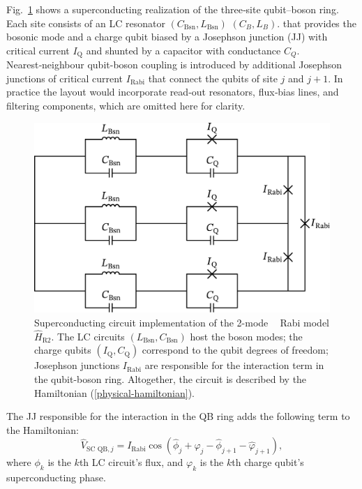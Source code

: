 \documentclass[reprint, aps, prx, amsmath, amssymb, longbibliography, superscriptaddress]{revtex4-2}
\newcommand{\dl}[1]{{\color{red}#1}}
\DeclareMathOperator{\Zthree}{\mathbb{Z}_3}
\begin{document}
Fig.~\ref{fig:superconducting-Rabi} shows a superconducting realization of the three‑site qubit–boson ring. Each site consists of an LC resonator $(C_{\text{Bsn}}, L_{\text{Bsn}})$ 
\dl{$(C_B, L_B)$}.
that provides the bosonic mode and a charge qubit biased by a Josephson junction (JJ) with critical current $I_{\text{Q}}$ and shunted by a capacitor with conductance $C_{Q}$. Nearest‑neighbour qubit-boson coupling is introduced by additional Josephson junctions of critical current $I_{\text{Rabi}}$ \cite{siewert_aspects_2000,rasmussen_controllable_2019,shafranjuk_twoqubit_2006,allman_tunable_2014,hu_controllable_2007} that connect the qubits of site $j$ and $j+1$. In practice the layout would incorporate read‑out resonators, flux‑bias lines, and filtering components, which are omitted here for clarity. 

\begin{figure}[t]
  \includegraphics[width=\linewidth]{pics/SC_Rabi_circuit_svg-tex.pdf}
  \caption{Superconducting circuit implementation of the 2-mode $\Zthree$ Rabi model $\hat H_{\text{R}2}$. The LC circuits $(L_{\text{Bsn}}, C_{\text{Bsn}})$ host the boson modes; the charge qubits $(I_{\text{Q}}, C_{\text{Q}})$ correspond to the qubit degrees of freedom; Josephson junctions $I_{\text{Rabi}}$ are responsible for the interaction term in the qubit-boson ring. Altogether, the circuit is described by the Hamiltonian (\ref{physical-hamiltonian}).}
  \label{fig:superconducting-Rabi}
\end{figure}

The JJ responsible for the interaction in the QB ring adds the following term to the Hamiltonian:
\begin{equation}
    \hat V_{\text{SC QB},j} = I_{\text{Rabi}}\cos(\hat \phi_j + \hat \varphi_j - \hat \phi_{j+1} - \hat \varphi_{j+1}),
\end{equation}
where $\phi_k$ is the $k$th LC circuit's flux, and $\varphi_k$ is the $k$th charge qubit's superconducting phase.
\end{document}
